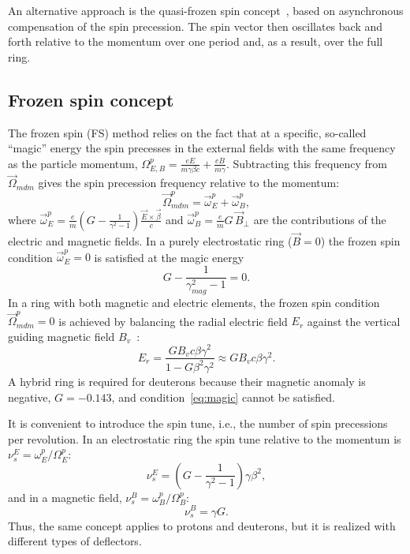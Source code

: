 An alternative approach is the quasi-frozen spin
concept~\cite{Senichev:2016rez}, based on asynchronous compensation of the spin
precession. The spin vector then oscillates back and forth relative to the
momentum over one period and, as a result, over the full ring.

\subsection{Frozen spin concept}

The frozen spin (FS) method relies on the fact that at a specific, so-called
``magic'' energy the spin precesses in the external fields with the same
frequency as the particle momentum,
$\Omega^{p}_{E,B} = \frac{eE}{m\gamma\beta c} + \frac{eB}{m\gamma}$.
Subtracting this frequency from $\vec{\Omega}_{mdm}$ gives the spin precession
frequency relative to the momentum:
\begin{equation}
  \vec{\Omega}^{p}_{mdm} = \vec{\omega}^{p}_{E} + \vec{\omega}^{p}_{B},
  \label{eq:omega_p}
\end{equation}
where
$\vec{\omega}^{p}_{E} = \frac{e}{m}\left(G-\frac{1}{\gamma^2-1}\right)\frac{\vec{E}\times\vec{\beta}}{c}$
and $\vec{\omega}^{p}_{B} = \frac{e}{m}G\,\vec{B}_{\perp}$ are the
contributions of the electric and magnetic fields. In a purely electrostatic
ring ($\vec{B}=0$) the frozen spin condition $\vec{\omega}^{p}_{E} = 0$ is
satisfied at the magic energy
\begin{equation}
  G - \frac{1}{\gamma_{mag}^2-1} = 0 .
  \label{eq:magic}
\end{equation}
In a ring with both magnetic and electric elements, the frozen spin condition
$\vec{\Omega}^{p}_{mdm}=0$ is achieved by balancing the radial electric field
$E_r$ against the vertical guiding magnetic field $B_v$~\cite{srEDM:2008_deuteron_proposal}:
\begin{equation}
  E_r = \frac{G B_v c\beta\gamma^2}{1-G\beta^2\gamma^2} \approx G B_v c\beta\gamma^2 .
  \label{eq:fs_hybrid}
\end{equation}
A hybrid ring is required for deuterons because their magnetic anomaly is
negative, $G = -0.143$, and condition~\eqref{eq:magic} cannot be satisfied.

It is convenient to introduce the spin tune, i.e., the number of spin
precessions per revolution. In an electrostatic ring the spin tune relative
to the momentum is $\nu_s^E = \omega^p_E/\Omega^p_E$:
\begin{equation}
  \nu_s^E = \left(G-\frac{1}{\gamma^2-1}\right)\gamma\beta^2 ,
  \label{eq:nu_e}
\end{equation}
and in a magnetic field, $\nu_s^B = \omega^p_B/\Omega^p_B$:
\begin{equation}
  \nu_s^B = \gamma G .
  \label{eq:nu_b}
\end{equation}
Thus, the same concept applies to protons and deuterons, but it is realized
with different types of deflectors.

